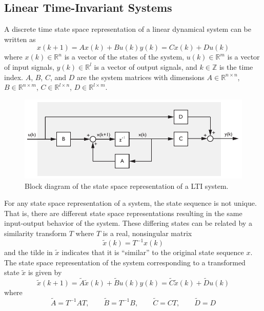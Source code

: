 \subsection{Linear Time-Invariant Systems}\label{sec:linear_time_invariant_systems}
A discrete time state space representation of a linear dynamical system can be written as
\begin{subequations}\label{eq:2_lti_state_space}
\begin{equation}x(k+1) = Ax(k) + Bu(k)\end{equation}
\begin{equation}y(k) = Cx(k) + Du(k)\end{equation}
\end{subequations}
where $x(k) \in \mathbb{R}^n$ is a vector of the states of the system, $u(k) \in \mathbb{R}^m$ is a vector of input signals, $y(k) \in \mathbb{R}^l$ is a vector of output signals, and  $k \in \mathbb{Z}$ is the time index. $A$, $B$, $C$, and $D$ are the system matrices with dimensions $A\in\mathbb{R}^{n\times n}$, $B\in\mathbb{R}^{n\times m}$, $C\in\mathbb{R}^{l\times n}$, $D\in\mathbb{R}^{l\times m}$.
\begin{figure}[htb!]
	\centering
	\includegraphics{../fig/lti_block_diagram.pdf}
	\caption{Block diagram of the state space representation of a LTI system.}
\end{figure}

For any state space representation of a system, the state sequence is not unique. That is, there are different state space representations resulting in the same input-output behavior of the system. These differing states can be related by a similarity transform $T$ where $T$ is a real, nonsingular matrix
\begin{equation*}
\tilde{x}(k) = T^{-1}x(k)
\end{equation*}
and the tilde in $\tilde x$ indicates that it is ``similar'' to the original state sequence $x$. The state space representation of the system corresponding to a transformed state $\tilde{x}$ is given by
\begin{subequations}
\begin{equation*}\tilde{x}(k+1) = \tilde{A}\tilde{x}(k) + \tilde{B}u(k)\end{equation*}
\begin{equation*}y(k) = \tilde{C}\tilde{x}(k) + \tilde{D}u(k)\end{equation*}
\end{subequations}
where
\begin{equation*}
\tilde{A} = T^{-1}AT, \qquad
\tilde{B} = T^{-1}B, \qquad
\tilde{C} = CT, \qquad
\tilde{D} = D
\end{equation*}

